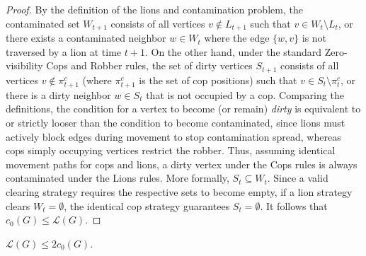 \documentclass[a4paper,UKenglish,cleveref, autoref, thm-restate]{lipics-v2021}
\begin{document}
\begin{proof}
By the definition of the lions and contamination problem, the contaminated set $W_{t+1}$ consists of all vertices $v \notin L_{t+1}$ such that $v \in W_t \setminus L_t$, or there exists a contaminated neighbor $w \in W_t$ where the edge $\{w, v\}$ is not traversed by a lion at time $t+1$.
On the other hand, under the standard Zero-visibility Cops and Robber rules, the set of dirty vertices $S_{t+1}$ consists of all vertices $v \notin \pi^c_{t+1}$ (where $\pi^c_{t+1}$ is the set of cop positions) such that $v \in S_t \setminus \pi^c_t$, or there is a dirty neighbor $w \in S_t$ that is not occupied by a cop.
Comparing the definitions, the condition for a vertex to become (or remain) \emph{dirty} is equivalent to or strictly looser than the condition to become contaminated, since lions must actively block edges during movement to stop contamination spread, whereas cops simply occupying vertices restrict the robber. Thus, assuming identical movement paths for cops and lions, a dirty vertex under the Cops rules is always contaminated under the Lions rules. More formally, $S_t \subseteq W_t$. Since a valid clearing strategy requires the respective sets to become empty, if a lion strategy clears $W_t = \emptyset$, the identical cop strategy guarantees $S_t = \emptyset$. It follows that $c_0(G) \le \mathcal{L}(G)$.
\end{proof}


\begin{lemma}
$\mathcal{L}(G) \le 2c_0(G)$.
\end{lemma}
\end{document}
